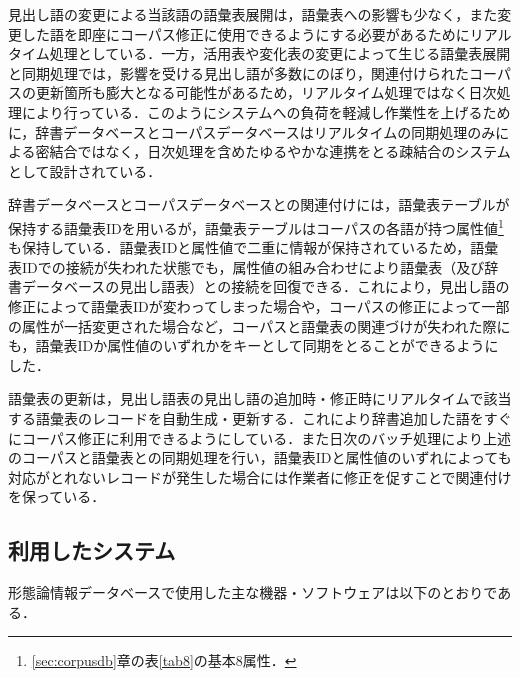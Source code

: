 \documentclass[japanese]{jnlp_1.4}
\begin{document}
見出し語の変更による当該語の語彙表展開は，語彙表への影響も少なく，また変更した語を即座にコーパス修正に使用できるようにする必要があるためにリアルタイム処理としている．一方，活用表や変化表の変更によって生じる語彙表展開と同期処理では，影響を受ける見出し語が多数にのぼり，関連付けられたコーパスの更新箇所も膨大となる可能性があるため，リアルタイム処理ではなく日次処理により行っている．このようにシステムへの負荷を軽減し作業性を上げるために，辞書データベースとコーパスデータベースはリアルタイムの同期処理のみによる密結合ではなく，日次処理を含めたゆるやかな連携をとる疎結合のシステムとして設計されている．

辞書データベースとコーパスデータベースとの関連付けには，語彙表テーブルが保持する語彙表IDを用いるが，語彙表テーブルはコーパスの各語が持つ属性値\footnote{\ref{sec:corpusdb}章の表\ref{tab8}の基本8属性．}も保持している．語彙表IDと属性値で二重に情報が保持されているため，語彙表IDでの接続が失われた状態でも，属性値の組み合わせにより語彙表（及び辞書データベースの見出し語表）との接続を回復できる．これにより，見出し語の修正によって語彙表IDが変わってしまった場合や，コーパスの修正によって一部の属性が一括変更された場合など，コーパスと語彙表の関連づけが失われた際にも，語彙表IDか属性値のいずれかをキーとして同期をとることができるようにした．

語彙表の更新は，見出し語表の見出し語の追加時・修正時にリアルタイムで該当する語彙表のレコードを自動生成・更新する．これにより辞書追加した語をすぐにコーパス修正に利用できるようにしている．また日次のバッチ処理により上述のコーパスと語彙表との同期処理を行い，語彙表IDと属性値のいずれによっても対応がとれないレコードが発生した場合には作業者に修正を促すことで関連付けを保っている．


\subsection{利用したシステム}

形態論情報データベースで使用した主な機器・ソフトウェアは以下のとおりである．
\end{document}
